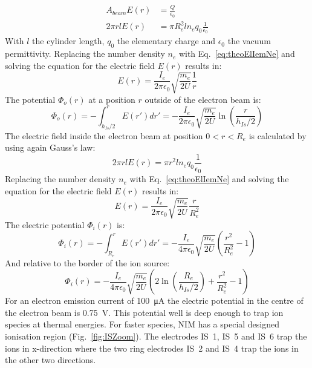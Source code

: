 	\begin{align}
		A_{beam} E(r) &= \frac{Q}{\epsilon_0}\\
		2\pi r l E(r) &= \pi R_e^2 l n_e q_0 \frac{1}{\epsilon_0}
	\end{align}
	With $l$ the cylinder length, $q_0$ the elementary charge and $\epsilon_0$ the vacuum permittivity. Replacing the number density $n_e$ with Eq.~\eqref{eq:theoElIemNe} and solving the equation for the electric field $E(r)$ results in:
	\begin{equation}
		E(r) = \frac{I_e}{2 \pi \epsilon_0} \sqrt{\frac{m_e}{2U}}\frac{1}{r}
	\end{equation}
	The potential $\Phi_o (r)$ at a position $r$ outside of the electron beam is:
	\begin{equation}
		\Phi_o (r) = -\int_{h_{Is}/2}^{r} E(r') dr' = -\frac{I_e}{2\pi\epsilon_0}\sqrt{\frac{m_e}{2U}}\ln\left(\frac{r}{h_{Is}/2}\right)
	\end{equation}
	The electric field inside the electron beam at position $0<r<R_e$ is calculated by using again Gauss's law:
	\begin{equation}
		2\pi r l E(r) = \pi r^2 l n_e q_0 \frac{1}{\epsilon_0}
	\end{equation}
	Replacing the number density $n_e$ with Eq.~\eqref{eq:theoElIemNe} and solving the equation for the electric field $E(r)$ results in:
	\begin{equation}
		E(r) = \frac{I_e}{2\pi\epsilon_0}\sqrt{\frac{m_e}{2U}}\frac{r}{R_e^2}
	\end{equation}
	The electric potential $\Phi_i (r)$ is:
	\begin{equation}
		\Phi_i (r) = -\int_{R_e}^{r} E(r') dr' = -\frac{I_e}{4\pi\epsilon_0}\sqrt{\frac{m_e}{2U}}\left(\frac{r^2}{R_e^2} -1 \right)
	\end{equation}
	And relative to the border of the ion source:
	\begin{equation}
		\Phi_i (r) = -\frac{I_e}{4\pi\epsilon_0}\sqrt{\frac{m_e}{2U}}\left(2\ln\left(\frac{R_e}{h_{Is}/2}\right) +\frac{r^2}{R_e^2} -1 \right)
		\label{eq:elPotIem}
	\end{equation}
	For an electron emission current of 100~\si{\micro\ampere} the electric potential in the centre of the electron beam is 0.75~\si{\volt}. This potential well is deep enough to trap ion species at thermal energies. For faster species, NIM has a special designed ionisation region (Fig.~\ref{fig:ISZoom}). The electrodes IS~1, IS~5 and IS~6 trap the ions in x-direction where the two ring electrodes IS~2 and IS~4 trap the ions in the other two directions.		
